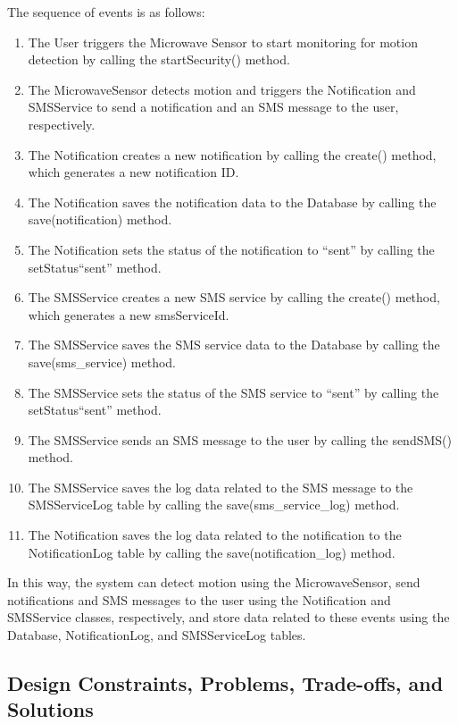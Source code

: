 The sequence of events is as follows:
\begin{enumerate}
    \item The User triggers the Microwave Sensor to start monitoring for motion detection
    by calling the startSecurity() method. %
    \item The MicrowaveSensor detects motion and triggers the Notification and SMSService
    to send a notification and an SMS message to the user, respectively. %
    \item The Notification creates a new notification by calling the create() method,
    which generates a new notification ID\@. %
    \item The Notification saves the notification data to the Database by calling the
    save(notification) method. %
    \item The Notification sets the status of the notification to ``sent'' by calling the
    setStatus``sent'' method. %
    \item The SMSService creates a new SMS service by calling the create() method,
    which generates a new smsServiceId. %
    \item The SMSService saves the SMS service data to the Database by calling the
    save(sms\_service) method. %
    \item The SMSService sets the status of the SMS service to ``sent'' by calling the
    setStatus``sent'' method. %
    \item The SMSService sends an SMS message to the user by calling the sendSMS()
    method. %
    \item The SMSService saves the log data related to the SMS message to the
    SMSServiceLog table by calling the save(sms\_service\_log) method. %
    \item The Notification saves the log data related to the notification to the
    NotificationLog table by calling the save(notification\_log) method. %
\end{enumerate}

In this way, the system can detect motion using the MicrowaveSensor, send notifications
and SMS messages to the user using the Notification and SMSService classes, respectively,
and store data related to these events using the Database, NotificationLog, and
SMSServiceLog tables. %

\subsection{Design Constraints, Problems, Trade-offs, and Solutions}\label{subsec:design-constraints-problems-trade-offs-and-solutions}

